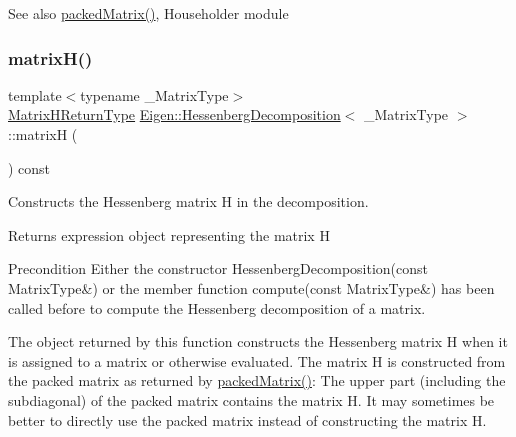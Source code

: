 \begin{DoxySeeAlso}{See also}
\mbox{\hyperlink{class_eigen_1_1_hessenberg_decomposition_a1f72b7612fd4edc5a6f31005e433e1dd}{packed\+Matrix()}}, Householder module 
\end{DoxySeeAlso}
\mbox{\label{class_eigen_1_1_hessenberg_decomposition_a8e781d2e22a2304647bcf0ae913cc8ea}} 
\subsubsection{\texorpdfstring{matrixH()}{matrixH()}}
{\footnotesize\ttfamily template$<$typename \+\_\+\+Matrix\+Type$>$ \\
\mbox{\hyperlink{struct_eigen_1_1internal_1_1_hessenberg_decomposition_matrix_h_return_type}{Matrix\+H\+Return\+Type}} \mbox{\hyperlink{class_eigen_1_1_hessenberg_decomposition}{Eigen\+::\+Hessenberg\+Decomposition}}$<$ \+\_\+\+Matrix\+Type $>$\+::matrixH (\begin{DoxyParamCaption}{ }\end{DoxyParamCaption}) const\hspace{0.3cm}{\ttfamily [inline]}}



Constructs the Hessenberg matrix H in the decomposition. 

\begin{DoxyReturn}{Returns}
expression object representing the matrix H
\end{DoxyReturn}
\begin{DoxyPrecond}{Precondition}
Either the constructor Hessenberg\+Decomposition(const Matrix\+Type\&) or the member function compute(const Matrix\+Type\&) has been called before to compute the Hessenberg decomposition of a matrix.
\end{DoxyPrecond}
The object returned by this function constructs the Hessenberg matrix H when it is assigned to a matrix or otherwise evaluated. The matrix H is constructed from the packed matrix as returned by \mbox{\hyperlink{class_eigen_1_1_hessenberg_decomposition_a1f72b7612fd4edc5a6f31005e433e1dd}{packed\+Matrix()}}\+: The upper part (including the subdiagonal) of the packed matrix contains the matrix H. It may sometimes be better to directly use the packed matrix instead of constructing the matrix H.

